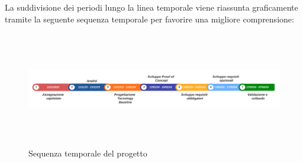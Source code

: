 \documentclass{article}
\begin{document}
La suddivisione dei periodi lungo la linea temporale viene riassunta graficamente tramite la seguente sequenza temporale per favorire una migliore comprensione:\\
\begin{figure}[h]
\includegraphics[width=18cm, height=5cm]{documenti/grafici/Sequenza temporale progetto.png}
\caption{Sequenza temporale del progetto}
\label{fig:STP}
\end{figure}
\end{document}
